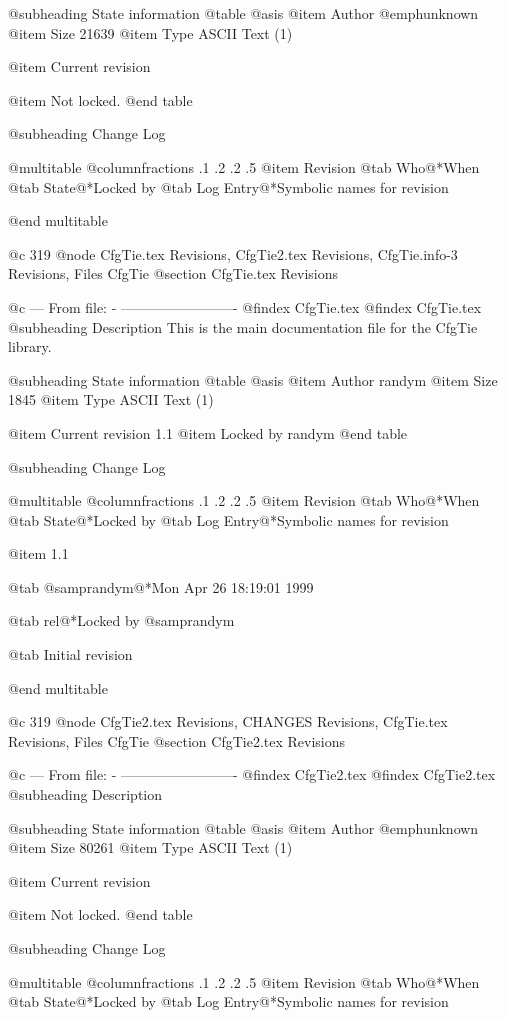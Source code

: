 @subheading State information
@table @asis
@item Author
@emph{unknown}
@item Size
21639
@item Type
ASCII Text (1)

@item Current revision

@item Not locked.
@end table

@subheading Change Log

@multitable @columnfractions .1 .2 .2 .5
@item Revision
@tab Who@*When
@tab State@*Locked by
@tab Log Entry@*Symbolic names for revision


@end multitable


@c 319
@node CfgTie.tex Revisions, CfgTie2.tex Revisions, CfgTie.info-3 Revisions, Files CfgTie
@section CfgTie.tex Revisions


@c --- From file: - -------------------------
@findex CfgTie.tex
@findex CfgTie.tex
@subheading Description
This is the main documentation file for the CfgTie library. 

@subheading State information
@table @asis
@item Author
randym
@item Size
1845
@item Type
ASCII Text (1)

@item Current revision
1.1
@item Locked by
randym
@end table

@subheading Change Log

@multitable @columnfractions .1 .2 .2 .5
@item Revision
@tab Who@*When
@tab State@*Locked by
@tab Log Entry@*Symbolic names for revision

@item 1.1



@tab @samp{randym}@*Mon Apr 26 18:19:01 1999

@tab rel@*Locked by @samp{randym}

@tab Initial revision 



@end multitable


@c 319
@node CfgTie2.tex Revisions, CHANGES Revisions, CfgTie.tex Revisions, Files CfgTie
@section CfgTie2.tex Revisions


@c --- From file: - -------------------------
@findex CfgTie2.tex
@findex CfgTie2.tex
@subheading Description


@subheading State information
@table @asis
@item Author
@emph{unknown}
@item Size
80261
@item Type
ASCII Text (1)

@item Current revision

@item Not locked.
@end table

@subheading Change Log

@multitable @columnfractions .1 .2 .2 .5
@item Revision
@tab Who@*When
@tab State@*Locked by
@tab Log Entry@*Symbolic names for revision


